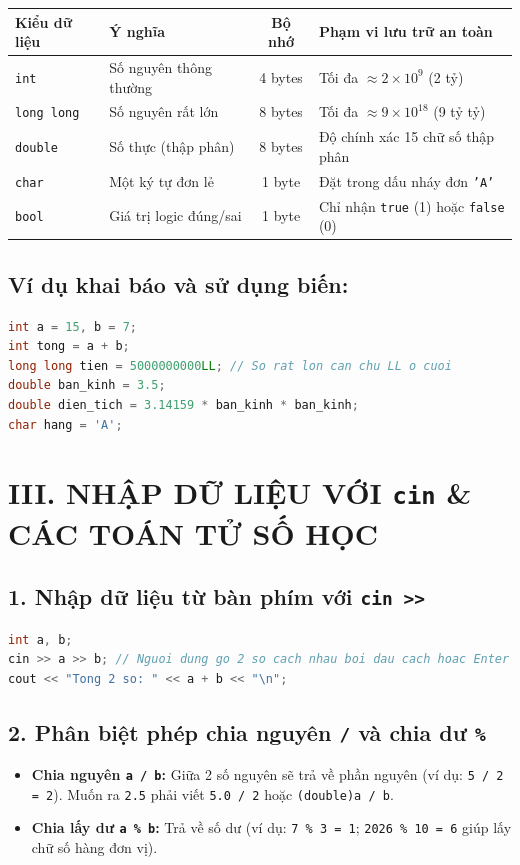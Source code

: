 \documentclass[11pt,a4paper]{article}
\begin{document}
\begin{center}
\small
\begin{tabular}{llcl}
\toprule
\textbf{Kiểu dữ liệu} & \textbf{Ý nghĩa} & \textbf{Bộ nhớ} & \textbf{Phạm vi lưu trữ an toàn} \\
\midrule
\texttt{int} & Số nguyên thông thường & 4 bytes & Tối đa $\approx 2 \times 10^9$ (2 tỷ) \\
\texttt{long long} & Số nguyên rất lớn & 8 bytes & Tối đa $\approx 9 \times 10^{18}$ (9 tỷ tỷ) \\
\texttt{double} & Số thực (thập phân) & 8 bytes & Độ chính xác 15 chữ số thập phân \\
\texttt{char} & Một ký tự đơn lẻ & 1 byte & Đặt trong dấu nháy đơn \texttt{'A'} \\
\texttt{bool} & Giá trị logic đúng/sai & 1 byte & Chỉ nhận \texttt{true} (1) hoặc \texttt{false} (0) \\
\bottomrule
\end{tabular}
\end{center}

\subsection*{\color{AsianBlue}Ví dụ khai báo và sử dụng biến:}
\begin{lstlisting}[language=C++]
int a = 15, b = 7;
int tong = a + b;
long long tien = 5000000000LL; // So rat lon can chu LL o cuoi
double ban_kinh = 3.5;
double dien_tich = 3.14159 * ban_kinh * ban_kinh;
char hang = 'A';
\end{lstlisting}

\section*{\color{AsianDarkBlue}III. NHẬP DỮ LIỆU VỚI \texttt{cin} \& CÁC TOÁN TỬ SỐ HỌC}

\subsection*{\color{AsianBlue}1. Nhập dữ liệu từ bàn phím với \texttt{cin >>}}
\begin{lstlisting}[language=C++]
int a, b;
cin >> a >> b; // Nguoi dung go 2 so cach nhau boi dau cach hoac Enter
cout << "Tong 2 so: " << a + b << "\n";
\end{lstlisting}

\subsection*{\color{AsianBlue}2. Phân biệt phép chia nguyên \texttt{/} và chia dư \texttt{\%}}
\begin{itemize}
    \setlength{\itemsep}{1.5pt}
    \small
    \item \textbf{Chia nguyên \texttt{a / b}:} Giữa 2 số nguyên sẽ trả về phần nguyên (ví dụ: \texttt{5 / 2 = 2}). Muốn ra \texttt{2.5} phải viết \texttt{5.0 / 2} hoặc \texttt{(double)a / b}.
    \item \textbf{Chia lấy dư \texttt{a \% b}:} Trả về số dư (ví dụ: \texttt{7 \% 3 = 1}; \texttt{2026 \% 10 = 6} giúp lấy chữ số hàng đơn vị).
\end{itemize}
\end{document}
